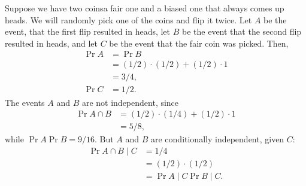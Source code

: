 Suppose we have two coins\dash a fair one and a biased one that always comes up heads.
We will randomly pick one of the coins and flip it twice.
Let $A$ be the event, that the first flip resulted in heads, let $B$ be the event that the second flip resulted in heads, and let $C$ be the event that the fair coin was picked.
Then,
\begin{align*}
    \Pr{A} &= \Pr{B} \\
    &= (1/2)\cdot(1/2)+(1/2)\cdot1 \\
    &= 3/4, \\
    \Pr{C} &= 1/2.
\end{align*}
The events $A$ and $B$ are not independent, since
\begin{align*}
    \Pr{A\cap B} &= (1/2)\cdot(1/4)+(1/2)\cdot1 \\
    &= 5/8,
\end{align*}
while $\Pr{A}\Pr{B}=9/16$.
But $A$ and $B$ are conditionally independent, given $C$:
\begin{align*}
    \Pr{A\cap B\mid C} &= 1/4 \\
    &= (1/2)\cdot(1/2) \\
    &= \Pr{A\mid C}\Pr{B\mid C}.
\end{align*}
